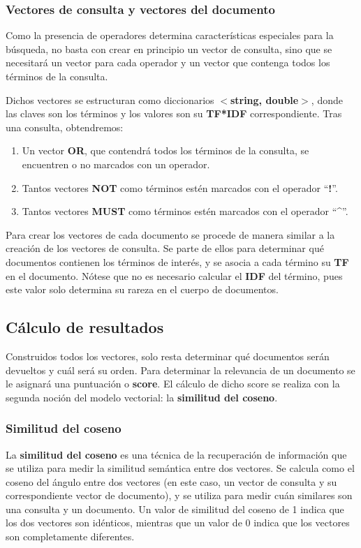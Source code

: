 \documentclass[12pt, letterpaper]{article}
\begin{document}
        \subsubsection{Vectores de consulta y vectores del documento}
        Como la presencia de operadores determina características especiales para la búsqueda, no basta con crear en principio un vector de consulta, sino que se necesitará un vector para cada operador y un vector que contenga todos los términos de la consulta.
        
        Dichos vectores se estructuran como diccionarios \textbf{$<$string, double$>$}, donde las claves son los términos y los valores son su \textbf{TF*IDF} correspondiente. Tras una consulta, obtendremos:
        \begin{enumerate}
            \item Un vector \textbf{OR}, que contendrá todos los términos de la consulta, se encuentren o no marcados con un operador.
            \item Tantos vectores \textbf{NOT} como términos estén marcados con el operador “\textbf{!}”.
            \item Tantos vectores \textbf{MUST} como términos estén marcados con el operador “\textbf{\textasciicircum}”.
        \end{enumerate}
        Para crear los vectores de cada documento se procede de manera similar a la creación de los vectores de consulta. Se parte de ellos para determinar qué documentos contienen los términos de interés, y se asocia a cada término su \textbf{TF} en el documento. Nótese que no es necesario calcular el \textbf{IDF} del término, pues este valor solo determina su rareza en el cuerpo de documentos.
    \subsection{Cálculo de resultados}
    Construidos todos los vectores, solo resta determinar qué documentos serán devueltos y cuál será su orden. Para determinar la relevancia de un documento se le asignará una puntuación o \textbf{score}. El cálculo de dicho score se realiza con la segunda noción del modelo vectorial: la \textbf{similitud del coseno}.
       
    \subsubsection{Similitud del coseno}
        La \textbf{similitud del coseno} es una técnica de la recuperación de información que se utiliza para medir la similitud semántica entre dos vectores. Se calcula como el coseno del ángulo entre  dos vectores (en este caso, un vector de consulta y su correspondiente vector de documento), y se utiliza para medir cuán similares son una consulta y un documento. Un valor de similitud del coseno de 1 indica que los dos vectores son idénticos, mientras que un valor de 0 indica que los vectores son completamente diferentes.
        
\end{document}
